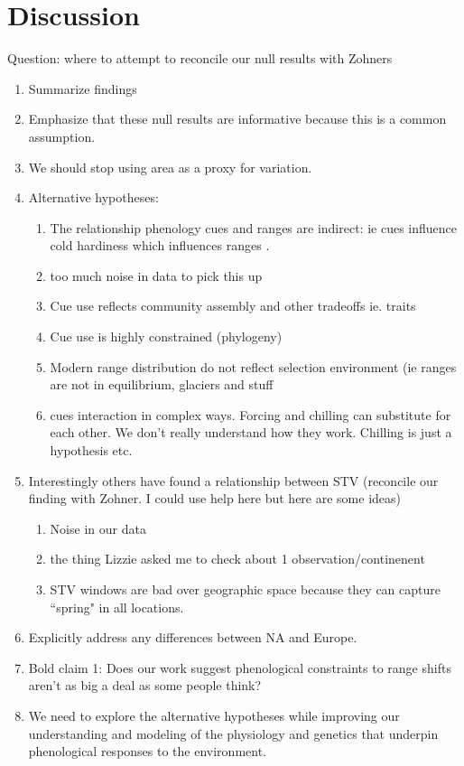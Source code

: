 \documentclass[11pt]{article}\usepackage[]{graphicx}\usepackage[]{color}
\begin{document}
\section*{Discussion}
Question: where to attempt to reconcile our null results with Zohners
\begin{enumerate}
\item Summarize findings
\item Emphasize that these null results are informative because this is a common assumption.
\item We should stop using area as a proxy for variation.
\item Alternative hypotheses:
\begin{enumerate}
\item The relationship phenology cues and ranges are indirect: ie cues influence cold hardiness which influences ranges \citep{}.
\item too much noise in data to pick this up
\item Cue use reflects community assembly and other tradeoffs ie. traits
\item Cue use is highly constrained (phylogeny)
\item Modern range distribution do not reflect selection environment (ie ranges are not in equilibrium, glaciers and stuff
\item cues interaction in complex ways. Forcing and chilling can substitute for each other. We don't really understand how they work. Chilling is just a hypothesis etc.
\end{enumerate}
\item Interestingly others have found a relationship between STV (reconcile our finding with Zohner. I could use help here but here are some ideas)
\begin{enumerate}
\item  Noise in our data
\item the thing Lizzie asked me to check about 1 observation/continenent
\item STV windows are bad over geographic space because they can capture ``spring" in all locations.
\end{enumerate}
\item Explicitly address any differences between NA and Europe.
\item Bold claim 1: Does our work suggest phenological constraints to range shifts aren't as big a deal as some people think?
\item We need to explore the alternative hypotheses while improving our understanding and modeling of the physiology and genetics that underpin phenological responses to the environment.
\end{enumerate}
\end{document}
